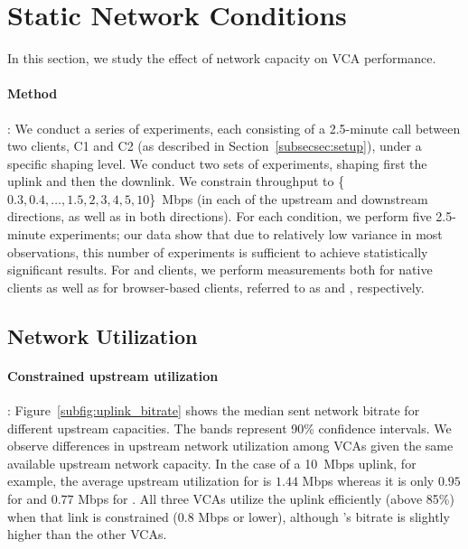 \section{Static Network Conditions}\label{sec:static}

In this section, we study the effect of network capacity on VCA performance.

\paragraph{Method}: We conduct a series of experiments, each consisting of a
2.5-minute call between two clients, C1 and C2 (as described in
Section~\ref{subsecsec:setup}), under a specific shaping level. We conduct two
sets of experiments, shaping first the uplink and then the downlink.  We
constrain throughput to \{$0.3, 0.4, \dots, 1.5, 2, 3, 4, 5, 10$\}~Mbps (in
each of the upstream and downstream directions, as well as in both
directions). For each condition, we perform five 2.5-minute experiments; our
data show that due to relatively low variance in most observations, this
number of experiments is sufficient to achieve statistically significant
results.  For \zoom and \teams clients, we perform measurements both for
native clients as well as for browser-based clients, referred to as
\zoombrowser and \teamsbrowser, respectively. 





\subsection{Network Utilization}
\label{subsec:network_utilization}

\paragraph{Constrained upstream utilization}: Figure~\ref{subfig:uplink_bitrate} shows the
median sent network bitrate for different upstream capacities. The bands
represent 90\% confidence intervals. We observe differences in upstream network
utilization among VCAs given the same available upstream network capacity. In
the case of a 10~Mbps uplink, for example, the average upstream utilization for
\teamsnative is $1.44$ Mbps whereas it is only $0.95$ for \meet and $0.77$
Mbps for \zoom. All three VCAs utilize the uplink efficiently (above 85\%)
when that link is constrained (0.8 Mbps or lower), although \meet's
bitrate is slightly higher than the other VCAs.  

